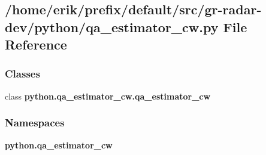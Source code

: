 \subsection{/home/erik/prefix/default/src/gr-\/radar-\/dev/python/qa\+\_\+estimator\+\_\+cw.py File Reference}
\label{qa__estimator__cw_8py}
\subsubsection*{Classes}
\begin{DoxyCompactItemize}
\item 
class {\bf python.\+qa\+\_\+estimator\+\_\+cw.\+qa\+\_\+estimator\+\_\+cw}
\end{DoxyCompactItemize}
\subsubsection*{Namespaces}
\begin{DoxyCompactItemize}
\item 
 {\bf python.\+qa\+\_\+estimator\+\_\+cw}
\end{DoxyCompactItemize}
